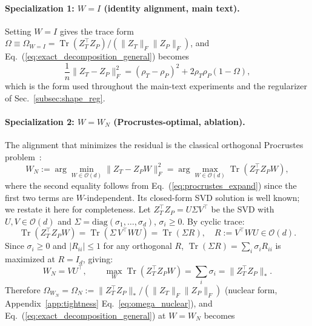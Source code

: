 \paragraph{Specialization 1: $W = I$ (identity alignment, main text).}
Setting $W = I$ gives the trace form $\Omega \equiv \Omega_{W=I} = \operatorname{Tr}(Z_T^\top Z_P)/(\|Z_T\|_F \|Z_P\|_F)$, and Eq.~(\ref{eq:exact_decomposition_general}) becomes
\begin{equation}
\frac{1}{n}\|Z_T - Z_P\|_F^2 = (\rho_T - \rho_P)^2 + 2\rho_T\rho_P(1 - \Omega),
\end{equation}
which is the form used throughout the main-text experiments and the regularizer of Sec.~\ref{subsec:shape_reg}.

\paragraph{Specialization 2: $W = W_N$ (Procrustes-optimal, ablation).}
The alignment that minimizes the residual is the classical orthogonal Procrustes problem~\cite{schonemann1966generalized, gower2004procrustes}:
\begin{equation}
W_N := \arg\min_{W \in \mathcal{O}(d)} \|Z_T - Z_P W\|_F^2 = \arg\max_{W \in \mathcal{O}(d)} \operatorname{Tr}(Z_T^\top Z_P W),
\end{equation}
where the second equality follows from Eq.~(\ref{eq:procrustes_expand}) since the first two terms are $W$-independent. Its closed-form SVD solution is well known; we restate it here for completeness. Let $Z_T^\top Z_P = U\Sigma V^\top$ be the SVD with $U, V \in \mathcal{O}(d)$ and $\Sigma = \mathrm{diag}(\sigma_1, \ldots, \sigma_d)$, $\sigma_i \ge 0$. By cyclic trace:
\begin{equation}
\operatorname{Tr}(Z_T^\top Z_P W) = \operatorname{Tr}(\Sigma\, V^\top W U) = \operatorname{Tr}(\Sigma R), \quad R := V^\top W U \in \mathcal{O}(d).
\end{equation}
Since $\sigma_i \ge 0$ and $|R_{ii}| \le 1$ for any orthogonal $R$, $\operatorname{Tr}(\Sigma R) = \sum_i \sigma_i R_{ii}$ is maximized at $R = I_d$, giving:
\begin{equation}
\label{eq:W_optimal}
W_N = V U^\top, \qquad \max_{W} \operatorname{Tr}(Z_T^\top Z_P W) = \sum_i \sigma_i = \|Z_T^\top Z_P\|_*.
\end{equation}
Therefore $\Omega_{W_N} = \Omega_N := \|Z_T^\top Z_P\|_*/(\|Z_T\|_F\|Z_P\|_F)$ (nuclear form, Appendix~\ref{app:tightness} Eq.~\ref{eq:omega_nuclear}), and Eq.~(\ref{eq:exact_decomposition_general}) at $W = W_N$ becomes
